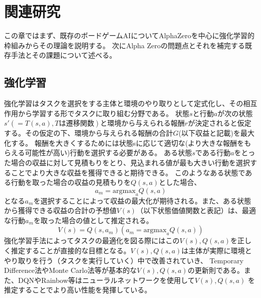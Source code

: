 \chapter{関連研究}
この章ではまず、既存のボードゲームAIについてAlphaZeroを中心に強化学習的枠組みからその理論を説明する。
次にAlpha Zeroの問題点とそれを補完する既存手法とその課題について述べる。



\section{強化学習\cite{RL}}
強化学習はタスクを選択をする主体と環境のやり取りとして定式化し、その相互作用から学習する形でタスクに取り組む分野である。
状態$s$と行動$a$が次の状態${s'}(=T(s, a), Tは遷移関数)$と環境から与えられる報酬$r$が決定されると仮定する。その仮定の下、環境から与えられる報酬の合計$G$(以下収益と記載)を最大化する。
報酬を大きくするためには状態sに応じて適切な(より大きな報酬をもらえる可能性が高い)行動を選択する必要がある。
ある状態$s$である行動$a$をとった場合の収益に対して見積もりをとり、見込まれる値が最も大きい行動を選択することでより大きな収益を獲得できると期待できる。
このようなある状態である行動を取った場合の収益の見積もりを$Q(s, a)$とした場合、
\begin{equation}
	{\displaystyle a_m = {\textrm{argmax}}_{a} Q(s, a)}
\end{equation}
となる$a_m$を選択することによって収益の最大化が期待される。また、ある状態から獲得できる収益の合計の予想値$V(s)$（以下状態価値関数と表記）は、最適な行動$a_m$を取った場合の値として推定される。
\begin{equation}
	{\displaystyle V(s) = Q(s, a_m)(a_m = \textrm{argmax}_{a} Q(s, a))}
\end{equation}
強化学習手法によってタスクの最適化を図る際にはこの$V(s),Q(s, a)$を正しく推定することが直接的な目標となる。$V(s),Q(s, a)$は主体が実際に環境とやり取りを行う（タスクを実行していく）中で改善されていき、
Temporary Difference法やMonte Carlo法等が基本的な$V(s),Q(s, a)$の更新則である。また、DQN\cite{DQN}やRainbow\cite{rainbow}等はニューラルネットワークを使用して$V(s),Q(s, a)$
を推定することでより高い性能を発揮している。



